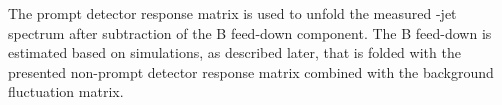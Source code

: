 The prompt detector response matrix is used to unfold the measured \Dstar-jet \pt spectrum after subtraction of the B feed-down component. The B feed-down is estimated based on simulations, as described later, that is folded with the presented non-prompt detector response matrix combined with the background fluctuation matrix.
%
%
%
%
%
%
%



